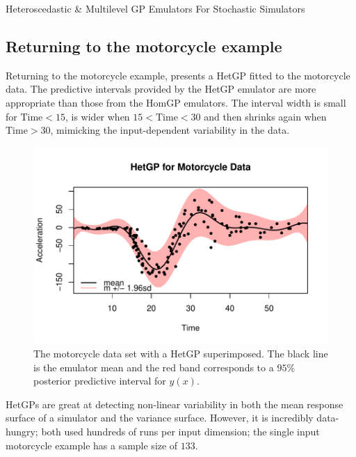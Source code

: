 \begin{chapter}{Heteroscedastic \& Multilevel GP Emulators For Stochastic Simulators\label{Ch:Hetsml}}
\subsection{Returning to the motorcycle example}
Returning to the motorcycle example,  presents a HetGP fitted to the motorcycle data. The predictive intervals provided by the HetGP emulator are more appropriate than those from the HomGP emulators. The interval width is small for $\text{Time} < 15$, is wider when $15 < \text{Time} < 30$ and then shrinks again when $\text{Time} > 30$, mimicking the input-dependent variability in the data.
\begin{figure}[ht]
	\includegraphics{fig-het-sml/mcycle-hetgp.pdf}
	\caption{The motorcycle data set with a HetGP superimposed. The black line is the emulator mean and the red band corresponds to a $95\%$ posterior predictive interval for $y(x)$.}
	\label{Fig:mcycle-het}
\end{figure}
HetGPs are great at detecting non-linear variability in both the mean response surface of a simulator and the variance surface. However, it is incredibly data-hungry; \citet{Binois2018, Zhang2022} both used hundreds of runs per input dimension; the single input motorcycle example has a sample size of $133$.


\end{chapter}
